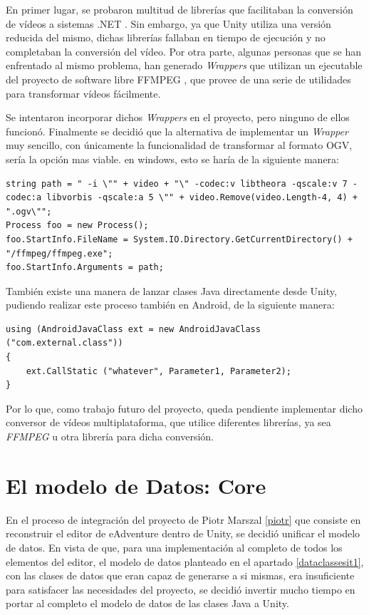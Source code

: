 En primer lugar, se probaron multitud de librerías que facilitaban la conversión de vídeos a sistemas .NET \cite{Middleware2003}. Sin embargo, ya que Unity utiliza una versión reducida del mismo, dichas librerías fallaban en tiempo de ejecución y no completaban la conversión del vídeo. Por otra parte, algunas personas que se han enfrentado al mismo problema, han generado \textit{Wrappers} que utilizan un ejecutable del proyecto de software libre FFMPEG \cite{ffmpeg}, que provee de una serie de utilidades para transformar vídeos fácilmente.

Se intentaron incorporar dichos \textit{Wrappers} en el proyecto, pero ninguno de ellos funcionó. Finalmente se decidió que la alternativa de implementar un \textit{Wrapper} muy sencillo, con únicamente la funcionalidad de transformar al formato OGV, sería la opción mas viable. en windows, esto se haría de la siguiente manera:

\begin{lstlisting}
string path = " -i \"" + video + "\" -codec:v libtheora -qscale:v 7 -codec:a libvorbis -qscale:a 5 \"" + video.Remove(video.Length-4, 4) + ".ogv\"";
Process foo = new Process();
foo.StartInfo.FileName = System.IO.Directory.GetCurrentDirectory() + "/ffmpeg/ffmpeg.exe";
foo.StartInfo.Arguments = path;
\end{lstlisting}

También existe una manera de lanzar clases Java directamente desde Unity, pudiendo realizar este proceso también en Android, de la siguiente manera:

\begin{lstlisting}
using (AndroidJavaClass ext = new AndroidJavaClass ("com.external.class")) 
{
	ext.CallStatic ("whatever", Parameter1, Parameter2);
}
\end{lstlisting}

Por lo que, como trabajo futuro del proyecto, queda pendiente implementar dicho conversor de vídeos multiplataforma, que utilice diferentes librerías, ya sea \textit{FFMPEG} u otra librería para dicha conversión.

\section{El modelo de Datos: Core}
\label{coreit2}

En el proceso de integración del proyecto de Piotr Marszal \ref{piotr} que consiste en reconstruir el editor de eAdventure dentro de Unity, se decidió unificar el modelo de datos. En vista de que, para una implementación al completo de todos los elementos del editor, el modelo de datos planteado en el apartado \ref{dataclassesit1}, con las clases de datos que eran capaz de generarse a si mismas, era insuficiente para satisfacer las necesidades del proyecto, se decidió invertir mucho tiempo en portar al completo el modelo de datos de las clases Java a Unity.

